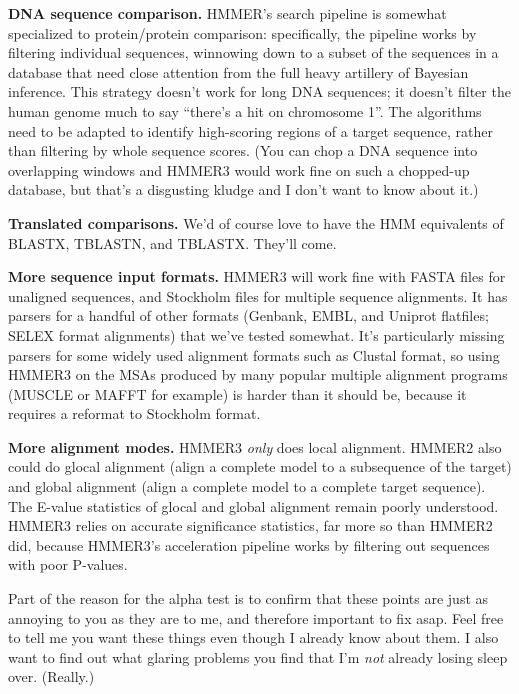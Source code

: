 \textbf{DNA sequence comparison.} HMMER's search pipeline is somewhat
specialized to protein/protein comparison: specifically, the pipeline
works by filtering individual sequences, winnowing down to a subset of
the sequences in a database that need close attention from the full
heavy artillery of Bayesian inference. This strategy doesn't work for
long DNA sequences; it doesn't filter the human genome much to say
``there's a hit on chromosome 1''. The algorithms need to be adapted
to identify high-scoring regions of a target sequence, rather than
filtering by whole sequence scores. (You can chop a DNA sequence into
overlapping windows and HMMER3 would work fine on such a chopped-up
database, but that's a disgusting kludge and I don't want to know
about it.)

\textbf{Translated comparisons.} We'd of course love to have the HMM
equivalents of BLASTX, TBLASTN, and TBLASTX. They'll come.

\textbf{More sequence input formats.} HMMER3 will work fine with FASTA
files for unaligned sequences, and Stockholm files for multiple
sequence alignments. It has parsers for a handful of other formats
(Genbank, EMBL, and Uniprot flatfiles; SELEX format alignments) that
we've tested somewhat. It's particularly missing parsers for some
widely used alignment formats such as Clustal format, so using HMMER3
on the MSAs produced by many popular multiple alignment programs
(MUSCLE or MAFFT for example) is harder than it should be, because it
requires a reformat to Stockholm format.

\textbf{More alignment modes.} HMMER3 \emph{only} does local
alignment. HMMER2 also could do glocal alignment (align a complete
model to a subsequence of the target) and global alignment (align a
complete model to a complete target sequence). The E-value statistics
of glocal and global alignment remain poorly understood. HMMER3 relies
on accurate significance statistics, far more so than HMMER2 did,
because HMMER3's acceleration pipeline works by filtering out
sequences with poor P-values.

\begin{sidebar}
Part of the reason for the alpha test is to confirm that these points
are just as annoying to you as they are to me, and therefore important
to fix asap. Feel free to tell me you want these things even though I
already know about them. I also want to find out what glaring problems
you find that I'm \emph{not} already losing sleep over. (Really.)
\end{sidebar}



